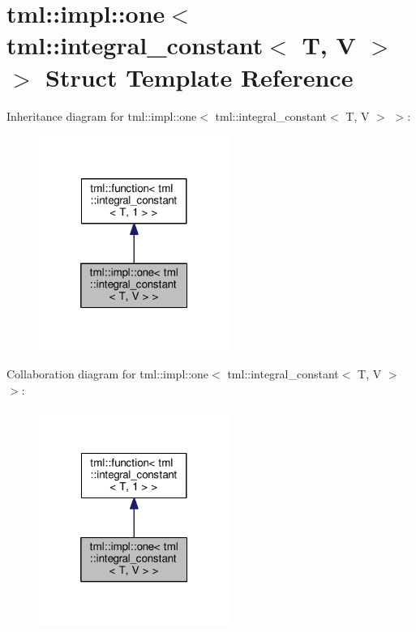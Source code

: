 \hypertarget{structtml_1_1impl_1_1one_3_01tml_1_1integral__constant_3_01_t_00_01_v_01_4_01_4}{\section{tml\+:\+:impl\+:\+:one$<$ tml\+:\+:integral\+\_\+constant$<$ T, V $>$ $>$ Struct Template Reference}
\label{structtml_1_1impl_1_1one_3_01tml_1_1integral__constant_3_01_t_00_01_v_01_4_01_4}
}


Inheritance diagram for tml\+:\+:impl\+:\+:one$<$ tml\+:\+:integral\+\_\+constant$<$ T, V $>$ $>$\+:
\nopagebreak
\begin{figure}[H]
\begin{center}
\leavevmode
\includegraphics[width=176pt]{structtml_1_1impl_1_1one_3_01tml_1_1integral__constant_3_01_t_00_01_v_01_4_01_4__inherit__graph}
\end{center}
\end{figure}


Collaboration diagram for tml\+:\+:impl\+:\+:one$<$ tml\+:\+:integral\+\_\+constant$<$ T, V $>$ $>$\+:
\nopagebreak
\begin{figure}[H]
\begin{center}
\leavevmode
\includegraphics[width=176pt]{structtml_1_1impl_1_1one_3_01tml_1_1integral__constant_3_01_t_00_01_v_01_4_01_4__coll__graph}
\end{center}
\end{figure}
